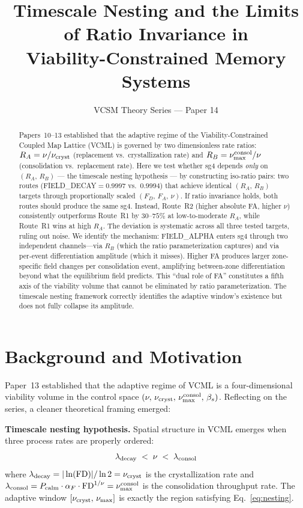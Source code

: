 \documentclass[11pt]{article}
\title{Timescale Nesting and the Limits of Ratio Invariance in\\
       Viability-Constrained Memory Systems}
\author{VCSM Theory Series --- Paper 14}
\date{}
\begin{document}
\maketitle

\begin{abstract}
Papers~10--13 established that the adaptive regime of the Viability-Constrained
Coupled Map Lattice (VCML) is governed by two dimensionless rate ratios:
$R_A = \nu/\nu_{\rm cryst}$ (replacement vs.\ crystallization rate) and
$R_B = \nu_{\rm max}^{\rm consol}/\nu$ (consolidation vs.\ replacement rate).
Here we test whether sg4 depends \emph{only} on $(R_A,\,R_B)$ --- the timescale
nesting hypothesis --- by constructing iso-ratio pairs: two routes
(FIELD\_DECAY$=0.9997$ vs.\ $0.9994$) that achieve identical
$(R_A,\,R_B)$ targets through proportionally scaled $(F_D,\,F_A,\,\nu)$.
If ratio invariance holds, both routes should produce the same sg4. Instead,
Route~R2 (higher absolute FA, higher $\nu$) consistently outperforms Route~R1
by $30$--$75\%$ at low-to-moderate $R_A$, while Route~R1 wins at high $R_A$.
The deviation is systematic across all three tested targets, ruling out noise.
We identify the mechanism: FIELD\_ALPHA enters sg4 through two independent
channels---via $R_B$ (which the ratio parameterization captures) and via
per-event differentiation amplitude (which it misses). Higher FA produces
larger zone-specific field changes per consolidation event, amplifying
between-zone differentiation beyond what the equilibrium field predicts.
This ``dual role of FA'' constitutes a fifth axis of the viability volume
that cannot be eliminated by ratio parameterization. The timescale nesting
framework correctly identifies the adaptive window's existence but does not
fully collapse its amplitude.
\end{abstract}

\section{Background and Motivation}

Paper~13 established that the adaptive regime of VCML is a four-dimensional
viability volume in the control space
$(\nu,\,\nu_{\rm cryst},\,\nu_{\rm max}^{\rm consol},\,\beta_s)$.
Reflecting on the series, a cleaner theoretical framing emerged:

\textbf{Timescale nesting hypothesis.} Spatial structure in VCML emerges when
three process rates are properly ordered:
\begin{equation}
\lambda_{\rm decay} \;<\; \nu \;<\; \lambda_{\rm consol}
\label{eq:nesting}
\end{equation}
where $\lambda_{\rm decay} = |\ln(\text{FD})|/\ln 2 = \nu_{\rm cryst}$ is the
crystallization rate and $\lambda_{\rm consol} = P_{\rm calm} \cdot \alpha_F
\cdot \text{FD}^{1/\nu} = \nu_{\rm max}^{\rm consol}$ is the consolidation
throughput rate. The adaptive window $[\nu_{\rm cryst},\,\nu_{\rm max}]$
is exactly the region satisfying Eq.~\eqref{eq:nesting}.
\end{document}
